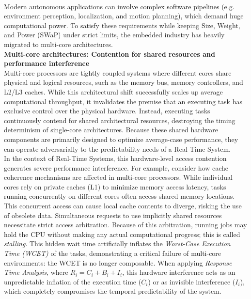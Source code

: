 \\
Modern autonomous applications can involve complex software pipelines (e.g. environment perception, localization, and motion planning), which demand huge computational power. To satisfy these requirements while keeping Size, Weight, and Power (SWaP) under strict limits, the embedded industry has heavily migrated to multi-core architectures.
\\
\textbf{Multi-core architectures: Contention for shared resources and performance interference} \\
Multi-core processors are tightly coupled systems where different cores share physical and logical resources, such as the memory bus, memory controllers, and L2/L3 caches. While this architectural shift successfully scales up average computational throughput, it invalidates the premise that an executing task has exclusive control over the physical hardware. Instead, executing tasks continuously contend for shared architectural resources, destroying the timing determinism of single-core architectures. Because these shared hardware components are primarily designed to optimize average-case performance, they can operate adversarially to the predictability needs of a Real-Time System.
\\
In the context of Real-Time Systems, this hardware-level access contention generates severe performance interference. 
For example, consider how cache coherence mechanisms are affected in multi-core processors. While individual cores rely on private caches (L1) to minimize memory access latency, tasks running concurrently on different cores often access shared memory locations. This concurrent access can cause local cache contents to diverge, risking the use of obsolete data.
Simultaneous requests to use implicitly shared resources necessitate strict access arbitration. Because of this arbitration, running jobs may hold the CPU without making any actual computational progress; this is called \textit{stalling}. This hidden wait time artificially inflates the \textit{Worst-Case Execution Time (WCET)} of the tasks, demonstrating a critical failure of multi-core environments: the WCET is no longer composable. When applying \textit{Response Time Analysis}, where $R_i = C_i + B_i + I_i$, this hardware interference acts as an unpredictable inflation of the execution time ($C_i$) or as invisible interference ($I_i$), which completely compromises the temporal predictability of the system.
